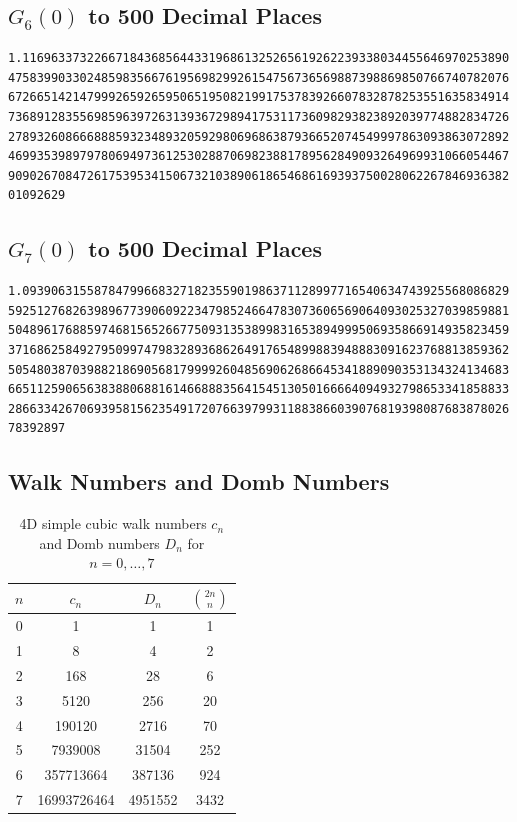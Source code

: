 \documentclass[12pt,a4paper]{article}
\numberwithin{equation}{section}
\theoremstyle{plain}
\theoremstyle{definition}
\theoremstyle{remark}
\begin{document}
\subsection{$G_6(0)$ to 500 Decimal Places}

\begin{small}
\begin{verbatim}
1.11696337322667184368564433196861325265619262239338034455646970253890
4758399033024859835667619569829926154756736569887398869850766740782076
6726651421479992659265950651950821991753783926607832878253551635834914
7368912835569859639726313936729894175311736098293823892039774882834726
2789326086668885932348932059298069686387936652074549997863093863072892
4699353989797806949736125302887069823881789562849093264969931066054467
9090267084726175395341506732103890618654686169393750028062267846936382
01092629
\end{verbatim}
\end{small}

\subsection{$G_7(0)$ to 500 Decimal Places}

\begin{small}
\begin{verbatim}
1.09390631558784799668327182355901986371128997716540634743925568086829
5925127682639896773906092234798524664783073606569064093025327039859881
5048961768859746815652667750931353899831653894999506935866914935823459
3716862584927950997479832893686264917654899883948883091623768813859362
5054803870398821869056817999926048569062686645341889090353134324134683
6651125906563838806881614668883564154513050166664094932798653341858833
2866334267069395815623549172076639799311883866039076819398087683878026
78392897
\end{verbatim}
\end{small}

\subsection{Walk Numbers and Domb Numbers}

\begin{table}[H]
\centering
\caption{4D simple cubic walk numbers $c_n$ and Domb numbers $D_n$ for $n = 0, \ldots, 7$}
\label{tab:walk-domb}
\begin{tabular}{@{}cccc@{}}
\toprule
$n$ & $c_n$ & $D_n$ & $\binom{2n}{n}$ \\
\midrule
0 & 1 & 1 & 1 \\
1 & 8 & 4 & 2 \\
2 & 168 & 28 & 6 \\
3 & 5120 & 256 & 20 \\
4 & 190120 & 2716 & 70 \\
5 & 7939008 & 31504 & 252 \\
6 & 357713664 & 387136 & 924 \\
7 & 16993726464 & 4951552 & 3432 \\
\bottomrule
\end{tabular}
\end{table}
\end{document}
